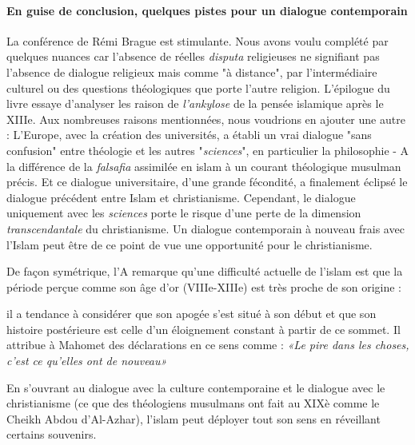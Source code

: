  

\paragraph{En guise de conclusion, quelques pistes pour un dialogue contemporain} La conférence de Rémi Brague est stimulante. Nous avons voulu complété par quelques nuances car l'absence de réelles \textit{disputa} religieuses ne signifiant pas l'absence de dialogue religieux mais comme "à distance", par l'intermédiaire culturel ou des questions théologiques que porte l'autre religion. 
L'épilogue du livre \cite{brague_sur_2023} essaye d'analyser les raison de \textit{l'ankylose} de la pensée islamique après le XIIIe. Aux nombreuses raisons mentionnées, nous voudrions en ajouter une autre : L'Europe, avec la création des universités, a établi un vrai dialogue "sans confusion" entre théologie et les autres "\textit{sciences}", en particulier la philosophie - A la différence de la \textit{falsafia} assimilée en islam à un courant théologique musulman précis. Et ce dialogue universitaire, d'une grande fécondité, a finalement éclipsé le dialogue précédent entre Islam et christianisme. Cependant, le dialogue uniquement avec les \textit{sciences} porte le risque d'une perte de la dimension \textit{transcendantale} du christianisme. Un dialogue contemporain à nouveau frais avec l'Islam peut être de ce point de vue une opportunité pour le christianisme.

De façon symétrique, l'A remarque qu'une difficulté actuelle de l'islam est que la période perçue comme son âge d'or (VIIIe-XIIIe) est très proche de son origine : 
\begin{singlequote}
    il a tendance à considérer que son apogée s'est situé à son début et que son histoire postérieure est celle d'un éloignement constant à partir de ce sommet. Il attribue à Mahomet des déclarations en ce sens comme :\textit{ «Le pire dans les choses, c'est ce qu'elles ont de nouveau» }  \cite[p.84]{brague_sur_2023}
\end{singlequote}
En s'ouvrant au dialogue avec la culture contemporaine et le dialogue avec le christianisme (ce que des théologiens musulmans ont fait au XIXè comme le Cheikh Abdou d'Al-Azhar), l'islam peut déployer tout son sens en réveillant certains souvenirs.
 
  